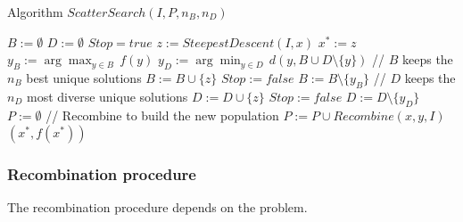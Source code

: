 \newpage

\begin{algorithm}[H]
	\caption{Algorithm $ScatterSearch(I , P, n_B , n_D)$}
	\begin{algorithmic}
		\STATE $B := \emptyset$ 
		\STATE $D := \emptyset$
		\REPEAT
		\STATE $Stop = true$
		\STATE $z := SteepestDescent(I , x)$
		\STATE $x^\ast := z$
		\ENDIF
		\STATE $y_B := \arg \max_{y \in B} \, f(y)$
		\STATE $y_D := \arg \min_{y \in D} \, d (y , B \cup D \setminus \{y \})$
		\STATE // $B$ keeps the $n_B$ best unique solutions
		\STATE $B := B \cup \{z\}$
		\STATE $Stop := false$ 
		\STATE $B := B \setminus \{y_B \}$
		\ENDIF
		\ELSE 
		\STATE // $D$ keeps the $n_D$ most diverse unique solutions
		\STATE $D := D \cup \{z\}$ 
		\STATE $Stop := false$ 
		\STATE $D := D \setminus \{y_D \}$
		\ENDIF
		\ENDIF
		\ENDIF
		\ENDFOR
		\STATE $P := \emptyset$
		\STATE // Recombine to build the new population
		\STATE $P := P \cup Recombine(x, y , I )$
		\ENDFOR
		\RETURN $(x^\ast, f (x^\ast))$
	\end{algorithmic}
\end{algorithm}

\newpage

\subsubsection{Recombination procedure}
The recombination procedure depends on the problem.\\

